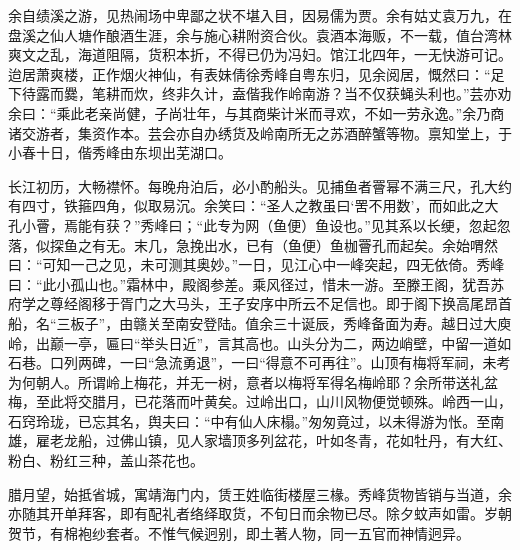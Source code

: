 \documentclass[]{article}
\begin{document}
余自绩溪之游，见热闹场中卑鄙之状不堪入目，因易儒为贾。余有姑丈袁万九，在盘溪之仙人塘作酿酒生涯，余与施心耕附资合伙。袁酒本海贩，不一载，值台湾林爽文之乱，海道阻隔，货积本折，不得已仍为冯妇。馆江北四年，一无快游可记。迨居萧爽楼，正作烟火神仙，有表妹倩徐秀峰自粤东归，见余阅居，慨然曰：``足下待露而爨，笔耕而炊，终非久计，盍偕我作岭南游？当不仅获蝇头利也。''芸亦劝余曰：``乘此老亲尚健，子尚壮年，与其商柴计米而寻欢，不如一劳永逸。''余乃商诸交游者，集资作本。芸会亦自办绣货及岭南所无之苏酒醉蟹等物。禀知堂上，于小春十日，偕秀峰由东坝出芜湖口。

长江初历，大畅襟怀。每晚舟泊后，必小酌船头。见捕鱼者罾幂不满三尺，孔大约有四寸，铁箍四角，似取易沉。余笑曰：``圣人之教虽曰`罟不用数'，而如此之大孔小罾，焉能有获？''秀峰曰；``此专为网（鱼便）鱼设也。''见其系以长绠，忽起忽落，似探鱼之有无。末几，急挽出水，已有（鱼便）鱼枷罾孔而起矣。余始喟然曰：``可知一己之见，未可测其奥妙。''一日，见江心中一峰突起，四无依倚。秀峰曰：``此小孤山也。''霜林中，殿阁参差。乘风径过，惜未一游。至滕王阁，犹吾苏府学之尊经阁移于胥门之大马头，王子安序中所云不足信也。即于阁下换高尾昂首船，名``三板子''，由赣关至南安登陆。值余三十诞辰，秀峰备面为寿。越日过大庾岭，出巅一亭，匾曰``举头日近''，言其高也。山头分为二，两边峭壁，中留一道如石巷。口列两碑，一曰``急流勇退''，一曰``得意不可再往''。山顶有梅将军祠，未考为何朝人。所谓岭上梅花，并无一树，意者以梅将军得名梅岭耶？余所带送礼盆梅，至此将交腊月，已花落而叶黄矣。过岭出口，山川风物便觉顿殊。岭西一山，石窍玲珑，已忘其名，舆夫曰：``中有仙人床榻。''匆匆竟过，以未得游为怅。至南雄，雇老龙船，过佛山镇，见人家墙顶多列盆花，叶如冬青，花如牡丹，有大红、粉白、粉红三种，盖山茶花也。

腊月望，始抵省城，寓靖海门内，赁王姓临街楼屋三椽。秀峰货物皆销与当道，余亦随其开单拜客，即有配礼者络绎取货，不旬日而余物已尽。除夕蚊声如雷。岁朝贺节，有棉袍纱套者。不惟气候迥别，即土著人物，同一五官而神情迥异。
\end{document}
